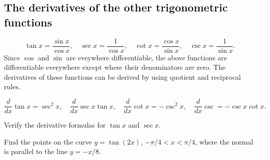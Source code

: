 \documentclass[../main.tex]{subfiles}
\begin{document}
  \subsection*{The derivatives of the other trigonometric functions}
  \[
    \tan x = \frac{\sin x}{\cos x}, \quad
    \sec x = \frac{1}{\cos x}, \quad
    \cot x = \frac{\cos x}{\sin x}, \quad
     \csc x = \frac{1}{\sin x}.
  \]
  Since $\cos$ and $\sin$ are eveywhere differentiable, the above functions are differentiable everywhere except where their denominators are zero. The derivatives of these functions can be derived by using quotient and reciprocal rules.

  \[
    \frac{d}{dx} \tan x= \sec^2 x, \quad
    \frac{d}{dx} \sec x \tan x, \quad
    \frac{d}{dx} \cot x = -\csc^2 x, \quad
    \frac{d}{dx} \csc = -\csc x \cot x.
  \]

  \begin{example}
    Verify the derivative formulas for $\tan x$ and $\sec x$.
  \end{example}

  \begin{example}
    Find the points on the curve $y=\tan(2x)$, $-\pi/4 < x < \pi/4$, where the normal is parallel to the line $y=-x/8$.
  \end{example}
\end{document}

